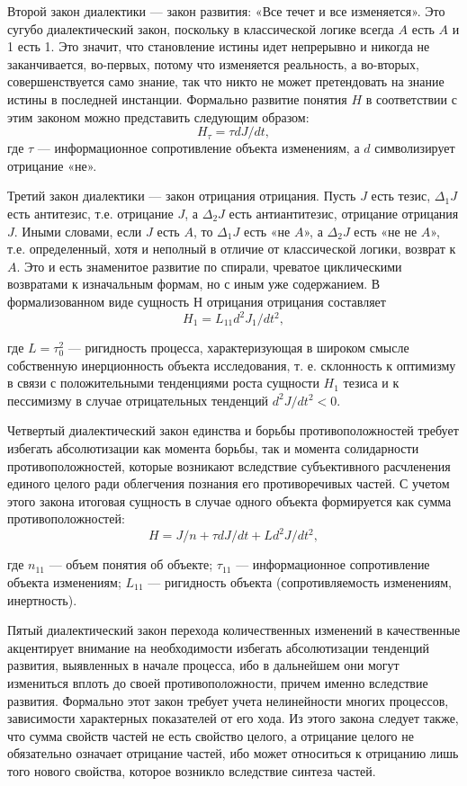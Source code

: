 \documentclass[a4paper,12pt]{report}
\begin{document}
     Второй закон диалектики — закон развития: «Все течет и все изменяется». Это сугубо диалектический закон, поскольку в классической логике всегда $A$ есть $A$ и 1 есть 1. Это значит, что становление истины идет непрерывно и никогда не заканчивается, во-первых, потому что изменяется реальность, а во-вторых, совершенствуется само знание, так что никто не может претендовать на знание истины в последней инстанции.
     Формально развитие понятия $H$ в соответствии с этим законом можно представить следующим образом:\\
     $$H_\tau = \tau dJ / dt,$$
     где $\tau$ — информационное сопротивление объекта изменениям, а $d$ символизирует отрицание «не».
     
     Третий закон диалектики — закон отрицания отрицания. Пусть $J$ есть тезис, $\Delta_1J$ есть антитезис, т.е. отрицание $J$, а $\Delta_2J$ есть антиантитезис, отрицание отрицания $J$. Иными словами, если $J$ есть $A$, то $\Delta_1J$ есть «не $A$», а $\Delta_2J$ есть «не не $A$», т.е. определенный, хотя и неполный в отличие от классической логики, возврат к $A$. Это и есть знаменитое развитие по спирали, чреватое циклическими возвратами к изначальным формам, но с иным уже содержанием.
     В формализованном виде сущность $Н$ отрицания отрицания составляет
$$H_1 = L_11 d^2 J_1 / dt^2 , $$ 	

где $L = \tau_0^2$  — ригидность процесса, характеризующая в широком смысле собственную
инерционность объекта исследования, т. е.
склонность к оптимизму в связи с положительными тенденциями роста сущности $H_1$ тезиса и к пессимизму в случае отрицательных тенденций $d^2 J / dt^2 < 0 $.
     
     Четвертый диалектический закон единства и борьбы противоположностей требует избегать абсолютизации как момента борьбы, так и момента солидарности противоположностей, которые возникают вследствие субъективного расчленения единого целого ради облегчения познания его противоречивых частей. С учетом этого закона итоговая сущность
в случае одного объекта формируется как
сумма противоположностей:
$$H = J / n + \tau dJ / dt + Ld^2 J / dt^2 ,  $$	

где $n_11$ — объем понятия об объекте; $\tau_11$ —
информационное сопротивление объекта
изменениям; $L_11$ — ригидность объекта (сопротивляемость изменениям, инертность).
     
     Пятый диалектический закон перехода количественных изменений в качественные акцентирует внимание на необходимости избегать абсолютизации тенденций развития, выявленных в начале процесса, ибо в дальнейшем они могут измениться вплоть до своей противоположности, причем именно вследствие развития. Формально этот закон требует учета нелинейности многих процессов, зависимости характерных показателей от его хода.
Из этого закона следует также, что сумма свойств частей не есть свойство целого, а отрицание целого не обязательно означает отрицание частей, ибо может относиться к отрицанию лишь того нового свойства, которое возникло вследствие синтеза частей.
\end{document}
